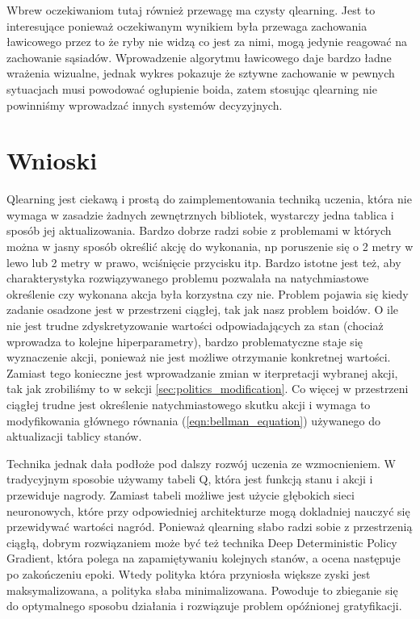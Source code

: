 \documentclass{article}
\begin{document}
Wbrew oczekiwaniom tutaj również przewagę ma czysty qlearning. Jest to interesujące ponieważ oczekiwanym wynikiem była przewaga zachowania ławicowego przez to że ryby nie widzą co jest za nimi, mogą jedynie reagować na zachowanie sąsiadów. Wprowadzenie algorytmu ławicowego daje bardzo ładne wrażenia wizualne, jednak wykres pokazuje że sztywne zachowanie w pewnych sytuacjach musi powodować ogłupienie boida, zatem stosując qlearning nie powinniśmy wprowadzać innych systemów decyzyjnych.
\section{Wnioski}
Qlearning jest ciekawą i prostą do zaimplementowania techniką uczenia, która nie wymaga w zasadzie żadnych zewnętrznych bibliotek, wystarczy jedna tablica i sposób jej aktualizowania. Bardzo dobrze radzi sobie z problemami w których można w jasny sposób określić akcję do wykonania, np poruszenie się o 2 metry w lewo lub 2 metry w prawo, wciśnięcie przycisku itp. Bardzo istotne jest też, aby charakterystyka rozwiązywanego problemu pozwalała na natychmiastowe określenie czy wykonana akcja była korzystna czy nie. Problem pojawia się kiedy zadanie osadzone jest w przestrzeni ciągłej, tak jak nasz problem boidów. O ile nie jest trudne zdyskretyzowanie wartości odpowiadających za stan (chociaż wprowadza to kolejne hiperparametry), bardzo problematyczne staje się wyznaczenie akcji, ponieważ nie jest możliwe otrzymanie konkretnej wartości. Zamiast tego konieczne jest wprowadzanie zmian w iterpretacji wybranej akcji, tak jak zrobiliśmy to w sekcji \ref{sec:politics_modification}. Co więcej w przestrzeni ciągłej trudne jest określenie natychmiastowego skutku akcji i wymaga to modyfikowania głównego równania (\ref{eqn:bellman_equation}) używanego do aktualizacji tablicy stanów.

Technika jednak dała podłoże pod dalszy rozwój uczenia ze wzmocnieniem. W tradycyjnym sposobie używamy tabeli Q, która jest funkcją stanu i akcji i przewiduje nagrody. Zamiast tabeli możliwe jest użycie głębokich sieci neuronowych, które przy odpowiedniej architekturze mogą dokladniej nauczyć się przewidywać wartości nagród. Ponieważ qlearning słabo radzi sobie z przestrzenią ciągłą, dobrym rozwiązaniem może być też technika Deep Deterministic Policy Gradient, która polega na zapamiętywaniu kolejnych stanów, a ocena następuje po zakończeniu epoki. Wtedy polityka która przyniosła większe zyski jest maksymalizowana, a polityka słaba minimalizowana. Powoduje to zbieganie się do optymalnego sposobu działania i rozwiązuje problem opóźnionej gratyfikacji.
\end{document}
